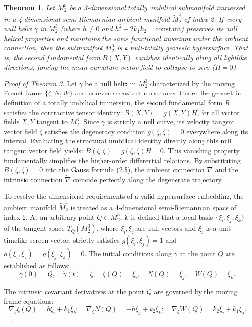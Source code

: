 \documentclass [reqno]{amsart}
\newtheorem{theorem}{Theorem}
\theoremstyle{plain}
\numberwithin{equation}{section}
\begin{document}
\begin{theorem}
Let $M_2^3$ be a 3-dimensional totally umbilical submanifold immersed in a 4-dimensional semi-Riemannian ambient manifold $\tilde{M}_2^4$ of index 2. If every null helix $\gamma$ in $M_2^3$ (where $h \neq 0$ and $h^2+2k_1 k_2=\text{constant}$) preserves its null helical properties and maintains the same functional invariant under the ambient connection, then the submanifold $M_2^3$ is a null-totally geodesic hypersurface. That is, the second fundamental form $B(X,Y)$ vanishes identically along all lightlike directions, forcing the mean curvature vector field to collapse to zero ($H = 0$).
\end{theorem}

\begin{proof}[Proof of Theorem 3]
Let $\gamma$ be a null helix in $M_2^3$ characterized by the moving Frenet frame $\{\zeta,N,W\}$ and non-zero constant curvatures. Under the geometric definition of a totally umbilical immersion, the second fundamental form $B$ satisfies the contractive tensor identity: $B(X,Y)=g(X,Y)H$, for all vector fields $X,Y$ tangent to $M_2^3$. Since $\gamma$ is strictly a null curve, its velocity tangent vector field $\zeta$ satisfies the degeneracy condition $g(\zeta,\zeta) = 0$ everywhere along its interval. Evaluating the structural umbilical identity directly along this null tangent vector field yields: $B(\zeta,\zeta)=g(\zeta,\zeta)H= 0$. This vanishing property fundamentally simplifies the higher-order differential relations. By substituting $B(\zeta,\zeta)= 0$ into the Gauss formula (2.5), the ambient connection $\nabla$ and the intrinsic connection $\tilde{\nabla}$ coincide perfectly along the degenerate trajectory.

To resolve the dimensional requirements of a valid hypersurface embedding, the ambient manifold $\tilde{M}_2^4$ is treated as a 4-dimensional semi-Riemannian space of index 2. At an arbitrary point $Q \in M_2^3$, it is defined that a local basis $\{\xi_i,\xi_j,\xi_k\}$ of the tangent space $T_Q(M_2^3)$, where $\xi_i, \xi_j$ are null vectors and $\xi_k$ is a unit timelike screen vector, strictly satisfies $g(\xi_i,\xi_j)=1$ and $g(\xi_i,\xi_k)=g(\xi_j,\xi_k)=0$. The initial conditions along $\gamma$ at the point $Q$ are established as follows:
\begin{equation}
\gamma(0)=Q, \quad \dot{\gamma}(t)=\zeta, \quad \zeta(Q)=\xi_i, \quad N(Q)=\xi_j, \quad W(Q)=\xi_k.
\end{equation}

The intrinsic covariant derivatives at the point $Q$ are governed by the moving frame equations:
\begin{equation}
\nabla_\zeta \zeta(Q)=h\xi_i+k_1 \xi_k; \quad \nabla_\zeta N(Q)=-h\xi_j+k_2 \xi_k; \quad \nabla_\zeta W(Q)=k_2 \xi_i+k_1 \xi_j.
\end{equation}


\end{proof}
\end{document}
